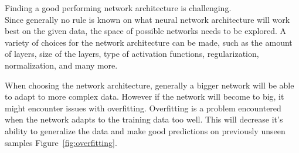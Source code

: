 

Finding a good performing network architecture is challenging. \\
Since generally no rule is known on what neural network architecture will work best on the given data, the space of possible networks needs to be explored.
A variety of choices for the network architecture can be made, such as the amount of layers, size of the layers, type of activation functions, regularization, normalization, and many more.

When choosing the network architecture, generally a bigger network will be able to adapt to more complex data.
However if the network will become to big, it might encounter issues with overfitting.
Overfitting is a problem encountered when the network adapts to the training data too well.
This will decrease it's ability to generalize the data and make good predictions on previously unseen samples Figure~\ref{fig:overfitting}.

